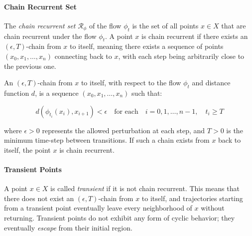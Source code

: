 \begin{flushleft}
\begin{flushleft}
        \paragraph{Chain Recurrent Set}

        \begin{flushleft}

            The \emph{chain recurrent set} $\mathcal{R}_\phi$ of the flow $\phi_t$ is the set of all points $x \in X$ that are chain recurrent under the flow $\phi_t$. A point $x$ is chain recurrent if there exists an $(\epsilon, T)$-chain from $x$ to itself, meaning there exists a sequence of points $(x_0, x_1, \dots, x_n)$ connecting back to $x$, with each step being arbitrarily close to the previous one.

            \begin{definition}
                An $(\epsilon, T)$-chain from $x$ to itself, with respect to the flow $\phi_t$ and distance function $d$, is a sequence $(x_0, x_1, \dots, x_n)$ such that:

                \begin{equation}
                    d(\phi_{t_i}(x_i), x_{i+1}) < \epsilon \quad \text{for each} \quad i = 0, 1, \dots, n-1, \quad t_i \geq T
                    \nonumber
                \end{equation}

                where $\epsilon > 0$ represents the allowed perturbation at each step, and $T > 0$ is the minimum time-step between transitions. If such a chain exists from $x$ back to itself, the point $x$ is chain recurrent.
            \end{definition}

        \end{flushleft}

        \paragraph{Transient Points}

        \begin{flushleft}
            A point $x \in X$ is called \emph{transient} if it is not chain recurrent. This means that there does not exist an $(\epsilon, T)$-chain from $x$ to itself, and trajectories starting from a transient point eventually leave every neighborhood of $x$ without returning. Transient points do not exhibit any form of cyclic behavior; they eventually \emph{escape} from their initial region.
        

\end{flushleft}
\end{flushleft}
\end{flushleft}
